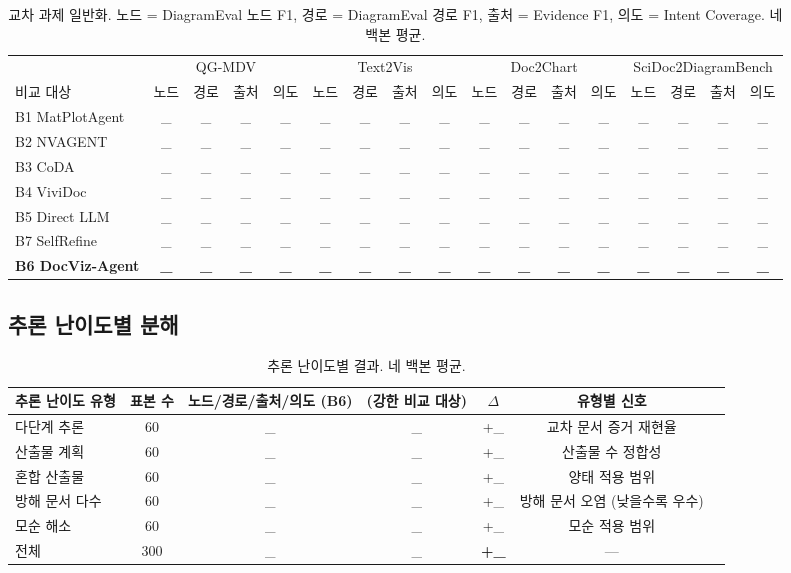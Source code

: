 \documentclass[11pt]{article}
\begin{document}
\begin{table}[h]
\centering
\tiny
\begin{tabular}{l|cccc|cccc|cccc|cccc}
\toprule
& \multicolumn{4}{c|}{QG-MDV} & \multicolumn{4}{c|}{Text2Vis} & \multicolumn{4}{c|}{Doc2Chart} & \multicolumn{4}{c}{SciDoc2DiagramBench} \\
비교 대상 & 노드 & 경로 & 출처 & 의도 & 노드 & 경로 & 출처 & 의도 & 노드 & 경로 & 출처 & 의도 & 노드 & 경로 & 출처 & 의도 \\
\midrule
B1 MatPlotAgent & \_ & \_ & \_ & \_ & \_ & \_ & \_ & \_ & \_ & \_ & \_ & \_ & \_ & \_ & \_ & \_ \\
B2 NVAGENT & \_ & \_ & \_ & \_ & \_ & \_ & \_ & \_ & \_ & \_ & \_ & \_ & \_ & \_ & \_ & \_ \\
B3 CoDA & \_ & \_ & \_ & \_ & \_ & \_ & \_ & \_ & \_ & \_ & \_ & \_ & \_ & \_ & \_ & \_ \\
B4 ViviDoc & \_ & \_ & \_ & \_ & \_ & \_ & \_ & \_ & \_ & \_ & \_ & \_ & \_ & \_ & \_ & \_ \\
B5 Direct LLM & \_ & \_ & \_ & \_ & \_ & \_ & \_ & \_ & \_ & \_ & \_ & \_ & \_ & \_ & \_ & \_ \\
B7 SelfRefine & \_ & \_ & \_ & \_ & \_ & \_ & \_ & \_ & \_ & \_ & \_ & \_ & \_ & \_ & \_ & \_ \\
\textbf{B6 DocViz-Agent} & \textbf{\_} & \textbf{\_} & \textbf{\_} & \textbf{\_} & \textbf{\_} & \textbf{\_} & \textbf{\_} & \textbf{\_} & \textbf{\_} & \textbf{\_} & \textbf{\_} & \textbf{\_} & \textbf{\_} & \textbf{\_} & \textbf{\_} & \textbf{\_} \\
\bottomrule
\end{tabular}
\caption{교차 과제 일반화. 노드 = DiagramEval 노드 F1, 경로 = DiagramEval 경로 F1, 출처 = Evidence F1, 의도 = Intent Coverage. 네 백본 평균.}
\label{tab:t1}
\end{table}

\subsection{추론 난이도별 분해}

\begin{table}[h]
\centering
\small
\begin{tabular}{l|c|cccc|c}
\toprule
추론 난이도 유형 & 표본 수 & 노드/경로/출처/의도 (B6) & (강한 비교 대상) & $\Delta$ & 유형별 신호 \\
\midrule
다단계 추론 & 60 & \_ & \_ & +\_ & 교차 문서 증거 재현율 \\
산출물 계획 & 60 & \_ & \_ & +\_ & 산출물 수 정합성 \\
혼합 산출물 & 60 & \_ & \_ & +\_ & 양태 적용 범위 \\
방해 문서 다수 & 60 & \_ & \_ & +\_ & 방해 문서 오염 (낮을수록 우수) \\
모순 해소 & 60 & \_ & \_ & +\_ & 모순 적용 범위 \\
\midrule
전체 & 300 & \_ & \_ & \textbf{+\_} & — \\
\bottomrule
\end{tabular}
\caption{추론 난이도별 결과. 네 백본 평균.}
\label{tab:t3}
\end{table}
\end{document}
